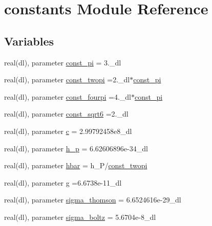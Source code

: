 \hypertarget{namespaceconstants}{}\section{constants Module Reference}
\label{namespaceconstants}
\subsection*{Variables}
\begin{DoxyCompactItemize}
\item 
real(dl), parameter \mbox{\hyperlink{namespaceconstants_ae6b5af15d3fb28a3dba468486c548447}{const\+\_\+pi}} = 3.\+\_\+dl
\item 
real(dl), parameter \mbox{\hyperlink{namespaceconstants_ad32ef1a62efe7e7467e8533103380ce5}{const\+\_\+twopi}} =2.\+\_\+dl$\ast$\mbox{\hyperlink{namespaceconstants_ae6b5af15d3fb28a3dba468486c548447}{const\+\_\+pi}}
\item 
real(dl), parameter \mbox{\hyperlink{namespaceconstants_a4bd1ae51e175028d0c5bc4d28c2143e6}{const\+\_\+fourpi}} =4.\+\_\+dl$\ast$\mbox{\hyperlink{namespaceconstants_ae6b5af15d3fb28a3dba468486c548447}{const\+\_\+pi}}
\item 
real(dl), parameter \mbox{\hyperlink{namespaceconstants_af93a9bf45c9332880bda283f3b872ea3}{const\+\_\+sqrt6}} =2.\+\_\+dl
\item 
real(dl), parameter \mbox{\hyperlink{namespaceconstants_acf9c352e48b37fa8a9aff3e5957246b8}{c}} = 2.\+99792458e8\+\_\+dl
\item 
real(dl), parameter \mbox{\hyperlink{namespaceconstants_a3bfcfec5bb3ae395c9384035afa3ff0b}{h\+\_\+p}} = 6.\+62606896e-\/34\+\_\+dl
\item 
real(dl), parameter \mbox{\hyperlink{namespaceconstants_abd8e8d59da6e319d106a046b7ffd1500}{hbar}} = h\+\_\+P/\mbox{\hyperlink{namespaceconstants_ad32ef1a62efe7e7467e8533103380ce5}{const\+\_\+twopi}}
\item 
real(dl), parameter \mbox{\hyperlink{namespaceconstants_aa3593b18a3808f0dc490d4473e3f3108}{g}} =6.\+6738e-\/11\+\_\+dl
\item 
real(dl), parameter \mbox{\hyperlink{namespaceconstants_aaf2f1c6fdfe22c4836ab4d2a47e53373}{sigma\+\_\+thomson}} = 6.\+6524616e-\/29\+\_\+dl
\item 
real(dl), parameter \mbox{\hyperlink{namespaceconstants_a7c87c2c8bfe2b2f647e1ebaf8f66d6df}{sigma\+\_\+boltz}} = 5.\+6704e-\/8\+\_\+dl
\item 

\end{DoxyCompactItemize}
